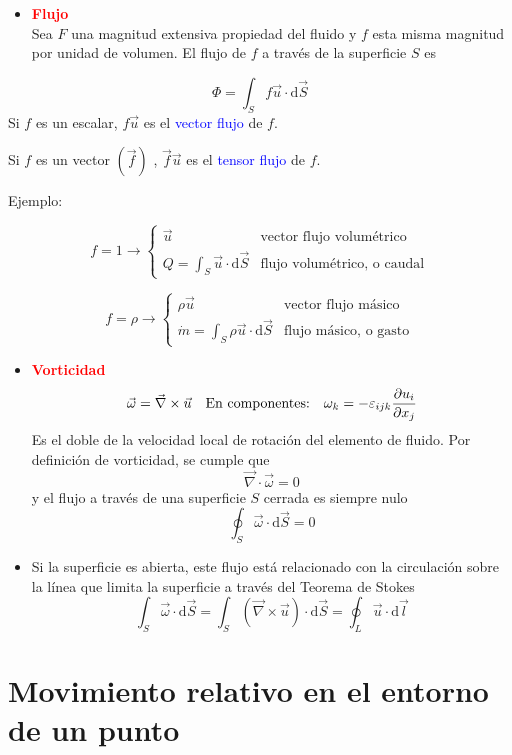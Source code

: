 	
	\begin{itemize}
		\item \textbf{\textcolor{red}{Flujo}}\\
		Sea $F$ una magnitud extensiva propiedad del fluido y $f$ esta
		misma magnitud por unidad de volumen. El flujo de $f$ a través de
		la superficie $S$ es
	\end{itemize}
	\[
	\Phi=\int_{S}f\vec{u}\cdot\text{d}\vec{S}
	\]
	Si $f$ es un escalar, $f\vec{u}$ es el \textcolor{blue}{vector
		flujo} de $f$.
	
	Si $f$ es un vector $\left(\vec{f}\right)$ , $\vec{f}\vec{u}$ es
	el \textcolor{blue}{tensor flujo} de $f$.

	
{Ejemplo:}
		
		\[
		f=1\rightarrow\begin{cases}
			\vec{u} & \textrm{vector flujo volumétrico}\\
			Q=\int_{S}\vec{u}\cdot\text{d}\vec{S} & \textrm{flujo volumétrico, o caudal}
		\end{cases}
		\]
		
		\[
		f=\rho\rightarrow\begin{cases}
			\rho\vec{u} & \textrm{vector flujo másico}\\
			\dot{m}=\int_{S}\rho\vec{u}\cdot\text{d}\vec{S} & \textrm{flujo másico, o gasto}
		\end{cases}
		\]
		

\begin{itemize}
	\item \textbf{\textcolor{red}{Vorticidad}}\\
	
	\[
	\vec{\omega}=\vec{\nabla}\times\vec{u}\quad\text{En componentes:}\quad\omega_{k}=-\varepsilon_{ijk}\frac{\partial u_{i}}{\partial x_{j}}
	\]
	Es el doble de la velocidad local de rotación del elemento de fluido.
	Por definición de vorticidad, se cumple que 
	\[
	\vec{\nabla}\cdot\vec{\omega}=0
	\]
	y el flujo a través de una superficie $S$ cerrada es siempre nulo
	\[
	\oint_{S}\vec{\omega}\cdot\text{d}\vec{S}=0
	\]
	\item Si la superficie es abierta, este flujo está relacionado con la circulación
	sobre la línea que limita la superficie a través del Teorema de Stokes
	\[
	\int_{S}\vec{\omega}\cdot\text{d}\vec{S}=\int_{S}\left(\vec{\nabla}\times\vec{u}\right)\cdot\text{d}\vec{S}=\oint_{L}\vec{u}\cdot\text{d}\vec{l}
	\]
	
\end{itemize}

\section{Movimiento relativo en el entorno de un punto}

